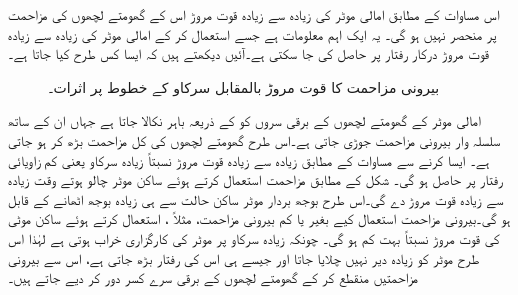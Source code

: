 اس مساوات کے مطابق امالی موٹر کی زیادہ سے زیادہ قوت مروڑ اس کے گھومتے لچھوں کی  مزاحمت پر منحصر نہیں ہو گی۔ یہ ایک اہم معلومات ہے جسے استعمال کر کے امالی موٹر کی زیادہ سے زیادہ قوت مروڑ درکار رفتار پر  حاصل کی جا سکتی ہے۔آئیں دیکھتے ہیں کہ ایسا کس طرح کیا جاتا ہے۔
\begin{figure}
\centering
%
\caption{بیرونی مزاحمت  کا قوت مروڑ بالمقابل سرکاو کے خطوط پر اثرات۔}
\label{شکل_امالی_بیرونی_مزاحمت_اور_مروٹ}
\end{figure}

امالی موٹر کے گھومتے لچھوں کے برقی سروں کو  کے ذریعہ باہر نکالا جاتا ہے جہاں ان کے ساتھ سلسلہ وار بیرونی مزاحمت جوڑی جاتی ہے۔اس طرح گھومتے لچھوں کی کل مزاحمت بڑھ کر  ہو جاتی ہے۔ ایسا کرنے سے مساوات   کے مطابق زیادہ سے زیادہ قوت مروڑ نسبتاً زیادہ سرکاو یعنی کم زاویائی رفتار پر حاصل ہو گی۔ شکل  کے مطابق مزاحمت  استعمال کرتے ہوئے ساکن موٹر چالو ہوتے  وقت زیادہ سے زیادہ قوت مروڑ دے گی۔اس طرح بوجھ بردار موٹر ساکن حالت سے ہی زیادہ بوجھ اٹھانے کے قابل ہو گی۔بیرونی مزاحمت استعمال کیے بغیر یا کم بیرونی مزاحمت، مثلاً ، استعمال کرتے ہوئے ساکن موٹی کی قوت مروڑ نسبتاً بہت کم ہو گی۔  چونکہ زیادہ سرکاو پر موٹر کی کارگزاری خراب ہوتی ہے لہٰذا اس طرح موٹر کو زیادہ دیر نہیں چلایا جاتا اور جیسے ہی اس کی رفتار بڑھ جاتی ہے، اس سے  بیرونی مزاحمتیں منقطع کر کے گھومتے لچھوں کے برقی سرے کسر دور کر دیے جاتے ہیں۔

